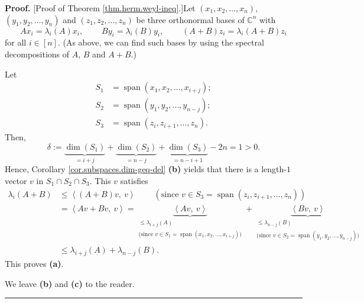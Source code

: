 \documentclass[numbers=enddot,12pt,final,onecolumn,notitlepage]{scrartcl}%
\numberwithin{exer}{subsection}
\theoremstyle{definition}
\newenvironment{proof}[1][Proof]{\noindent\textbf{#1.} }{\ \rule{0.5em}{0.5em}}
\begin{document}
\begin{proof}
[Proof of Theorem \ref{thm.herm.weyl-ineq}.]Let $\left(  x_{1},x_{2}%
,\ldots,x_{n}\right)  $, $\left(  y_{1},y_{2},\ldots,y_{n}\right)  $ and
$\left(  z_{1},z_{2},\ldots,z_{n}\right)  $ be three orthonormal bases of
$\mathbb{C}^{n}$ with%
\[
Ax_{i}=\lambda_{i}\left(  A\right)  x_{i},\ \ \ \ \ \ \ \ \ \ By_{i}%
=\lambda_{i}\left(  B\right)  y_{i},\ \ \ \ \ \ \ \ \ \ \left(  A+B\right)
z_{i}=\lambda_{i}\left(  A+B\right)  z_{i}%
\]
for all $i\in\left[  n\right]  $. (As above, we can find such bases by using
the spectral decompositions of $A$, $B$ and $A+B$.)

Let
\begin{align*}
S_{1}  &  =\operatorname*{span}\left(  x_{1},x_{2},\ldots,x_{i+j}\right)  ;\\
S_{2}  &  =\operatorname*{span}\left(  y_{1},y_{2},\ldots,y_{n-j}\right)  ;\\
S_{3}  &  =\operatorname*{span}\left(  z_{i},z_{i+1},\ldots,z_{n}\right)  .
\end{align*}
Then,%
\[
\delta:=\underbrace{\dim\left(  S_{1}\right)  }_{=i+j}+\underbrace{\dim\left(
S_{2}\right)  }_{=n-j}+\underbrace{\dim\left(  S_{3}\right)  }_{=n-i+1}%
-2n=1>0.
\]
Hence, Corollary \ref{cor.subspaces.dim-geq-del} \textbf{(b)} yields that
there is a length-$1$ vector $v$ in $S_{1}\cap S_{2}\cap S_{3}$. This $v$
satisfies%
\begin{align*}
\lambda_{i}\left(  A+B\right)   &  \leq\left\langle \left(  A+B\right)
v,\ v\right\rangle \ \ \ \ \ \ \ \ \ \ \left(  \text{since }v\in
S_{3}=\operatorname*{span}\left(  z_{i},z_{i+1},\ldots,z_{n}\right)  \right)
\\
&  =\left\langle Av+Bv,\ v\right\rangle =\underbrace{\left\langle
Av,\ v\right\rangle }_{\substack{\leq\lambda_{i+j}\left(  A\right)
\\\text{(since }v\in S_{1}=\operatorname*{span}\left(  x_{1},x_{2}%
,\ldots,x_{i+j}\right)  \text{)}}}+\underbrace{\left\langle
Bv,\ v\right\rangle }_{\substack{\leq\lambda_{n-j}\left(  B\right)
\\\text{(since }v\in S_{2}=\operatorname*{span}\left(  y_{1},y_{2}%
,\ldots,y_{n-j}\right)  \text{)}}}\\
&  \leq\lambda_{i+j}\left(  A\right)  +\lambda_{n-j}\left(  B\right)  .
\end{align*}
This proves \textbf{(a)}.

We leave \textbf{(b)} and \textbf{(c)} to the reader.
\end{proof}
\end{document}
